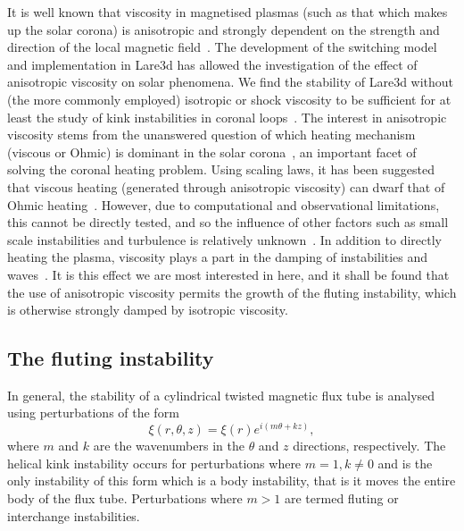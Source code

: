 \documentclass[12pt]{article}
\begin{document}
It is well known that viscosity in magnetised plasmas (such as that which makes up the solar corona) is anisotropic and strongly dependent on the strength and direction of the local magnetic field~\cite{hollwegViscosityChewGoldbergerLowEquations1986a,hollwegViscosityMagnetizedPlasma1985,braginskiiTransportProcessesPlasma1965}. The development of the switching model~\cite{mactaggartBraginskiiMagnetohydrodynamicsArbitrary2017} and implementation in Lare3d has allowed the investigation of the effect of anisotropic viscosity on solar phenomena. We find the stability of Lare3d without (the more commonly employed) isotropic or shock viscosity to be sufficient for at least the study of kink instabilities in coronal loops~\cite{quinnEffectAnisotropicViscosity2020a}. The interest in anisotropic viscosity stems from the unanswered question of which heating mechanism (viscous or Ohmic) is dominant in the solar corona~\cite{klimchukSolvingCoronalHeating2006a}, an important facet of solving the coronal heating problem. Using scaling laws, it has been suggested that viscous heating (generated through anisotropic viscosity) can dwarf that of Ohmic heating~\cite{craigAnisotropicViscousDissipation2009a,litvinenkoViscousEnergyDissipation2005}. However, due to computational and observational limitations, this cannot be directly tested, and so the influence of other factors such as small scale instabilities and turbulence is relatively unknown~\cite{klimchukSolvingCoronalHeating2006a}. In addition to directly heating the plasma, viscosity plays a part in the damping of instabilities and waves~\cite{rudermanSlowSurfaceWave2000a}. It is this effect we are most interested in here, and it shall be found that the use of anisotropic viscosity permits the growth of the fluting instability, which is otherwise strongly damped by isotropic viscosity.

\subsection{The fluting instability}

In general, the stability of a cylindrical twisted magnetic flux tube is analysed using perturbations of the form
\begin{equation}
  \label{eq:kink_perturbation}
\xi(r, \theta, z) = \xi(r) e^{i(m\theta + kz)},
\end{equation}
where $m$ and $k$ are the wavenumbers in the $\theta$ and $z$ directions, respectively. The helical kink instability occurs for perturbations where $m=1, k\ne0$ and is the only instability of this form which is a body instability, that is it moves the entire body of the flux tube. Perturbations where $m>1$ are termed fluting or interchange instabilities.
\end{document}
